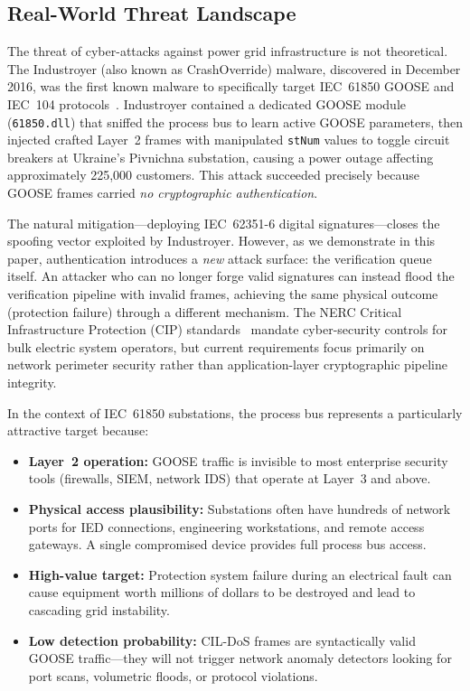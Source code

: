 \documentclass{ieeeaccess}
\begin{document}
\subsection{Real-World Threat Landscape}
The threat of cyber-attacks against power grid infrastructure is not theoretical. The Industroyer (also known as CrashOverride) malware, discovered in December 2016, was the first known malware to specifically target IEC~61850 GOOSE and IEC~104 protocols~\cite{cherepanov2017industroyer, dragos2017crashoverride}. Industroyer contained a dedicated GOOSE module (\texttt{61850.dll}) that sniffed the process bus to learn active GOOSE parameters, then injected crafted Layer~2 frames with manipulated \texttt{stNum} values to toggle circuit breakers at Ukraine's Pivnichna substation, causing a power outage affecting approximately 225,000 customers. This attack succeeded precisely because GOOSE frames carried \emph{no cryptographic authentication}.

The natural mitigation---deploying IEC~62351-6 digital signatures---closes the spoofing vector exploited by Industroyer. However, as we demonstrate in this paper, authentication introduces a \emph{new} attack surface: the verification queue itself. An attacker who can no longer forge valid signatures can instead flood the verification pipeline with invalid frames, achieving the same physical outcome (protection failure) through a different mechanism. The NERC Critical Infrastructure Protection (CIP) standards~\cite{nerc_cip_v7} mandate cyber-security controls for bulk electric system operators, but current requirements focus primarily on network perimeter security rather than application-layer cryptographic pipeline integrity.

In the context of IEC~61850 substations, the process bus represents a particularly attractive target because:
\begin{itemize}[leftmargin=*]
    \item \textbf{Layer~2 operation:} GOOSE traffic is invisible to most enterprise security tools (firewalls, SIEM, network IDS) that operate at Layer~3 and above.
    \item \textbf{Physical access plausibility:} Substations often have hundreds of network ports for IED connections, engineering workstations, and remote access gateways. A single compromised device provides full process bus access.
    \item \textbf{High-value target:} Protection system failure during an electrical fault can cause equipment worth millions of dollars to be destroyed and lead to cascading grid instability.
    \item \textbf{Low detection probability:} CIL-DoS frames are syntactically valid GOOSE traffic---they will not trigger network anomaly detectors looking for port scans, volumetric floods, or protocol violations.
\end{itemize}
\end{document}
